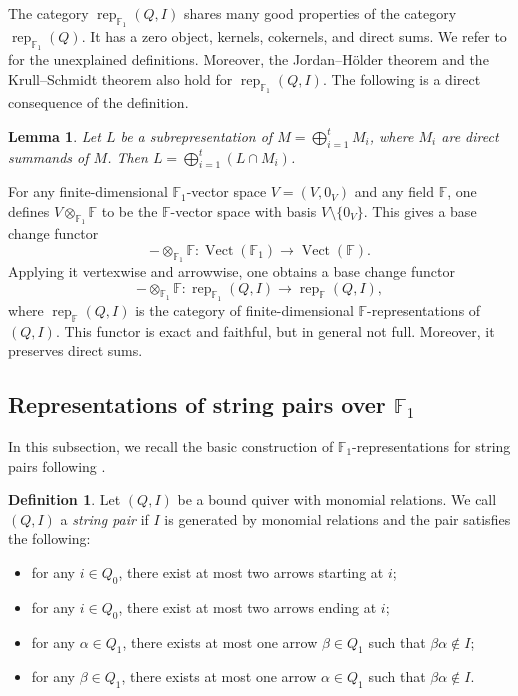 \documentclass[12pt]{amsart}
\newtheorem{lemma}[theorem]{Lemma}
\theoremstyle{remark}
\theoremstyle{definition}
\newtheorem{definition}[theorem]{Definition}
\numberwithin{equation}{section}
\begin{document}
The
category $\operatorname{rep}_{\mathbb{F}_1}(Q,I)$ shares many good properties of the category $\operatorname{rep}_{\mathbb{F}_1}(Q)$. It has a zero object, kernels, cokernels, and direct sums. We refer to  \cite{Sz12} for the unexplained definitions. Moreover, the Jordan--H\"older theorem and the Krull--Schmidt theorem also hold for $\operatorname{rep}_{\mathbb{F}_1}(Q,I)$. The following is a direct consequence of the definition.
\begin{lemma}\label{lem:subrep-direct-sum-decomp}
    Let ${L}$ be a subrepresentation of ${M}=\bigoplus_{i=1}^t{M}_i$, where ${M}_i$ are direct summands of ${M}$. Then ${L}=\bigoplus_{i=1}^t({L}\cap {M}_i)$.
\end{lemma}

For any finite-dimensional $\mathbb{F}_1$-vector space $V=(V,0_V)$ and any field $\mathbb{F}$, one defines $V\otimes_{\mathbb{F}_1}\mathbb{F}$ to be the $\mathbb{F}$-vector space with basis $V\setminus\{0_V\}$. This gives a base change functor
\[
-\otimes_{\mathbb{F}_1}\mathbb{F}:\operatorname{Vect}(\mathbb{F}_1)\to \operatorname{Vect}(\mathbb{F}).
\]
Applying it vertexwise and arrowwise, one obtains a base change functor
\[
-\otimes_{\mathbb{F}_1}\mathbb{F}:\operatorname{rep}_{\mathbb{F}_1}(Q,I)\to \operatorname{rep}_\mathbb{F}(Q,I),
\]
where $\operatorname{rep}_\mathbb{F}(Q,I)$ is the category of finite-dimensional $\mathbb{F}$-representations of $(Q,I)$.
 This functor is exact and faithful, but in general not full. Moreover, it preserves direct sums.

\subsection{Representations of string pairs over $\mathbb{F}_1$}
In this subsection, we recall the basic construction of $\mathbb{F}_1$-representations for string pairs following \cite{TF25}.
\begin{definition}\cite{BR87}
Let $(Q,I)$ be a bound quiver with monomial relations.  We call $(Q,I)$  a {\em string pair} if $I$ is generated by monomial relations and the pair satisfies the following: 
\begin{itemize}
    \item[(s1)] for any $i \in Q_0$, there exist at most two arrows starting at $i$;
    \item[(s1')] for any $i \in Q_0$, there exist at most two arrows ending at $i$;
    \item[(s2)] for any $\alpha \in Q_1$, there exists at most one arrow $\beta \in Q_1$ such that  $\beta\alpha\notin I$;
    \item[(s2')] for any $\beta \in Q_1$, there exists at most one arrow $\alpha \in Q_1$ such that $\beta\alpha\notin I$.
\end{itemize}
\end{definition}
\end{document}
